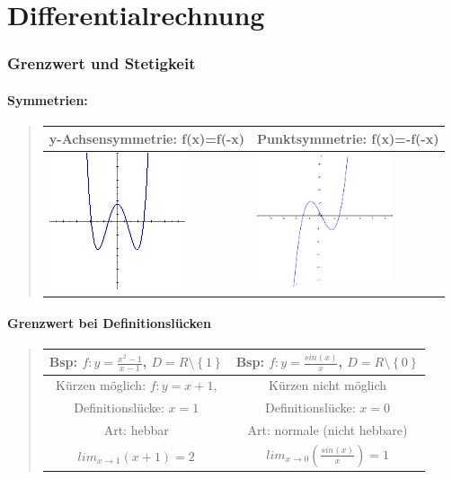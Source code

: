 
\part*{{\huge Differentialrechnung}}


\section*{{\large Grenzwert und Stetigkeit}}


\subsection*{Symmetrien:}
\begin{quote}
\begin{tabular}{|l||l|}
\hline 
y-Achsensymmetrie: f(x)=f(-x) & Punktsymmetrie: f(x)=-f(-x)\tabularnewline
\hline 
\includegraphics[width=4cm]{Differentialrechnung/achsensymm1} & \includegraphics[width=4cm]{Differentialrechnung/Punktsym.jpg}\tabularnewline
\hline 
\end{tabular}
\end{quote}

\subsection*{Grenzwert bei Definitionslücken}
\begin{quote}
\begin{tabular}{|c|c|}
\hline 
Bsp: $f:y=\frac{x^{2}-1}{x-1}$, $D=R\setminus\left\{ 1\right\} $ & Bsp: $f:y=\frac{sin(x)}{x}$, $D=R\setminus\left\{ 0\right\} $\tabularnewline
\hline 
Kürzen möglich: $f:y=x+1$, & Kürzen nicht möglich\tabularnewline
\hline 
Definitionslücke: $x=1$ & Definitionslücke: $x=0$\tabularnewline
\hline 
Art: hebbar & Art: normale (nicht hebbare)\tabularnewline
\hline 
$lim_{x\rightarrow1}(x+1)=2$ & $lim_{x\rightarrow0}(\frac{sin(x)}{x})=1$\tabularnewline
\hline 
\end{tabular}
\end{quote}

